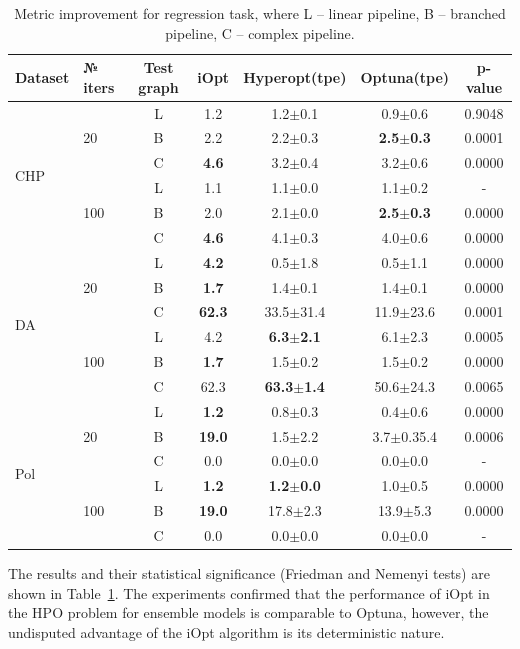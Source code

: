 \documentclass[iicol]{sn-jnl}
\theoremstyle{thmstyleone}%
\theoremstyle{thmstyletwo}%
\theoremstyle{thmstylethree}%
\begin{document}
\begin{table}
\centering
\caption{Metric improvement for regression task, where L -- linear pipeline, B -- branched pipeline, C -- complex pipeline.}
\label{tab:automl_reg}
\begin{tabular}{llccccc} \hline
Dataset & № iters & Test graph& iOpt & Hyperopt(tpe) & Optuna(tpe) & p-value\\ \hline
\multirow{6}{*}{CHP} & \multirow{3}{*}{20} & L& 1.2 & 1.2$\pm$0.1& 0.9$\pm$0.6& 0.9048 \\
 &  & B& 2.2& 2.2$\pm$0.3& \textbf{2.5$\pm$0.3}& 0.0001\\
 &  & C& \textbf{4.6} & 3.2$\pm$0.4& 3.2$\pm$0.6& 0.0000 \\
 & \multirow{3}{*}{100} & L
& 1.1& 1.1$\pm$0.0& 1.1$\pm$0.2& -\\
 &  & B
& 2.0& 2.1$\pm$0.0& \textbf{2.5$\pm$0.3}& 0.0000\\
 &  & C& \textbf{4.6} & 4.1$\pm$0.3& 4.0$\pm$0.6& 0.0000 \\ \hline
\multirow{6}{*}{DA} & \multirow{3}{*}{20} & L 
& \textbf{4.2} & 0.5$\pm$1.8& 0.5$\pm$1.1& 0.0000 \\ 
 &  & B
& \textbf{1.7}& 1.4$\pm$0.1& 1.4$\pm$0.1& 0.0000\\
 &  & C& \textbf{62.3} & 33.5$\pm$31.4& 11.9$\pm$23.6& 0.0001 \\
 & \multirow{3}{*}{100} & L
& 4.2 & \textbf{6.3$\pm$2.1}& 6.1$\pm$2.3& 0.0005 \\
 &  & 
B& \textbf{1.7}& 1.5$\pm$0.2& 1.5$\pm$0.2& 0.0000\\
 &  & C& 62.3 & \textbf{63.3$\pm$1.4}& 50.6$\pm$24.3& 0.0065 \\ \hline
\multirow{6}{*}{Pol} & \multirow{3}{*}{20} & 
L
& \textbf{1.2} & 0.8$\pm$0.3& 0.4$\pm$0.6& 0.0000 \\
 &  & 
B& \textbf{19.0}& 1.5$\pm$2.2& 3.7$\pm$0.35.4& 0.0006\\
 &  & C& 0.0 & 0.0$\pm$0.0& 0.0$\pm$0.0& -  \\ 
 & \multirow{3}{*}{100} & L& \textbf{1.2} & \textbf{1.2$\pm$0.0}& 1.0$\pm$0.5& 0.0000 \\
 &  &  B& \textbf{19.0}& 17.8$\pm$2.3& 13.9$\pm$5.3& 0.0000\\
 &  & C& 0.0 & 0.0$\pm$0.0& 0.0$\pm$0.0& - \\ \hline
\end{tabular}
\end{table}

The results and their statistical significance (Friedman and Nemenyi tests) are shown in Table~\ref{tab:automl_reg}.
The experiments confirmed that the performance of iOpt in the HPO problem for ensemble models is comparable to Optuna, however, the undisputed advantage of the iOpt algorithm is its deterministic nature.
\end{document}

